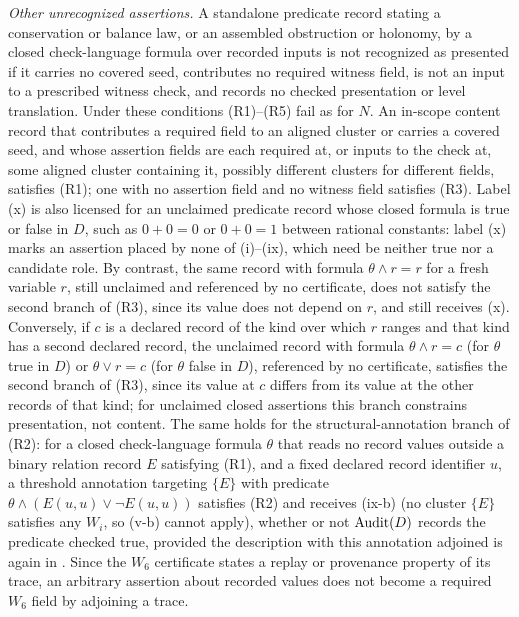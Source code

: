 \begin{remark}
\emph{Other unrecognized assertions.} A standalone predicate record stating a conservation or balance law, or an
assembled obstruction or holonomy, by a closed check-language formula over
recorded inputs is not recognized as presented if it carries no covered seed,
contributes no required witness field, is not an input to a prescribed witness
check, and records no checked presentation or level translation. Under these
conditions (R1)--(R5) fail as for \(N\).
An in-scope content record that contributes a required field to an aligned
cluster or carries a covered seed, and whose assertion fields are each required
at, or inputs to the check at, some aligned cluster containing it, possibly
different clusters for different fields, satisfies (R1); one with no assertion
field and no witness field satisfies (R3).
Label (x) is also licensed for an unclaimed predicate record whose closed
formula is true or false in \(D\), such as \(0+0=0\) or \(0+0=1\) between rational constants: label (x) marks an assertion placed
by none of (i)--(ix), which need be neither true nor a candidate role. By contrast, the same record
with formula \(\theta\wedge r=r\) for a fresh variable \(r\), still unclaimed and
referenced by no certificate, does not satisfy the second branch of (R3), since its value does not depend on
\(r\), and still receives (x). Conversely, if \(c\) is a declared record of the kind over which \(r\) ranges and that kind has a second declared record, the unclaimed record with formula \(\theta\wedge r=c\) (for \(\theta\) true in \(D\)) or \(\theta\vee r=c\) (for \(\theta\) false in \(D\)), referenced by no certificate, satisfies the second branch of (R3), since its value at \(c\) differs from its value at the other records of that kind; for unclaimed closed assertions this branch constrains presentation, not content. The same holds for the structural-annotation branch of (R2): for a closed check-language formula \(\theta\) that reads no record values outside a binary relation record \(E\) satisfying (R1), and a fixed declared record identifier \(u\), a threshold annotation targeting \(\{E\}\) with predicate \(\theta\wedge(E(u,u)\vee\neg E(u,u))\) satisfies (R2) and receives (ix-b) (no cluster \(\{E\}\) satisfies any \(W_i\), so (v-b) cannot apply), whether or not \(\operatorname{Audit}\!\left(D\right)\) records the predicate checked true, provided the description with this annotation adjoined is again in \FATCD{}. Since the
\(W_6\) certificate states a replay or provenance property of its trace, an
arbitrary assertion about recorded values does not become a required
\(W_6\) field by adjoining a trace.


\end{remark}
